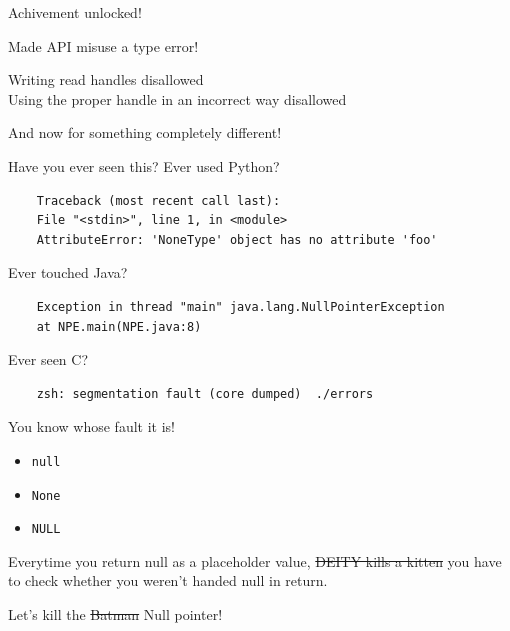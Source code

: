 \documentclass{beamer}
\begin{document}
\begin{frame}{Achivement unlocked!}
  \begin{center}
    {\Huge Made API misuse a type error!}
  \end{center}
  \checkmark Writing read handles disallowed\\
  \checkmark Using the proper handle in an incorrect way disallowed
\end{frame}

\begin{frame}
  \begin{center}
    {\Huge And now for something completely different!}
  \end{center}
\end{frame}

\begin{frame}[fragile]{Have you ever seen this?}
  Ever used Python?
  \begin{verbatim}
    Traceback (most recent call last):
    File "<stdin>", line 1, in <module>
    AttributeError: 'NoneType' object has no attribute 'foo'
  \end{verbatim}
  \pause
  Ever touched Java?
  \begin{verbatim}
    Exception in thread "main" java.lang.NullPointerException
    at NPE.main(NPE.java:8)
  \end{verbatim}
  \pause
  Ever seen C?
  \begin{verbatim}
    zsh: segmentation fault (core dumped)  ./errors
  \end{verbatim}
\end{frame}

\begin{frame}{You know whose fault it is!}
  \begin{itemize}
    \item \texttt{null}
    \item \texttt{None}
    \item \texttt{NULL}
  \end{itemize}
  \pause
  Everytime you return null as a placeholder value, 
  \sout{\textdollar{}DEITY kills a kitten}
  you have to check whether you weren't handed null in return.
\end{frame}

\begin{frame}
  \begin{center}
    {\Huge Let's kill the \sout{Batman} Null pointer!}
  \end{center}
\end{frame}
\end{document}
